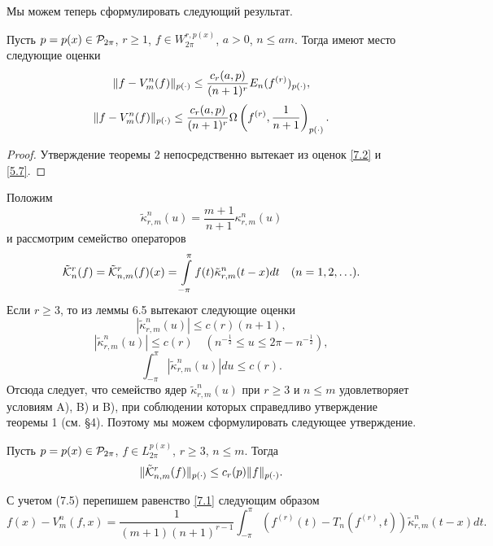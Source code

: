 Мы можем теперь сформулировать следующий результат.
\begin{theorem}\label{t2}
Пусть  $p=p(x)\in{\cal  P}_{2\pi}$, $r\ge1$, $f\in W^{r,p(x)}_{2\pi}$, $a>0$, $n\le am$. Тогда имеют место следующие оценки
\begin{equation}\label{7.3}
   \|f-V_m^n(f)\|_{p(\cdot)}\le {c_r(a,p)\over (n+1)^r}E_n(f^{(r)})_{p(\cdot)},
\end{equation}
\begin{equation}\label{7.4}
   \|f-V_m^n(f)\|_{p(\cdot)}\le {c_r(a,p)\over (n+1)^r}\Omega\left(f^{(r)},\frac1{n+1}\right)_{p(\cdot)}.
\end{equation}
\end{theorem}
\begin{proof}
Утверждение теоремы 2 непосредственно вытекает из оценок \eqref{7.2} и \eqref{5.7}.
\end{proof}
Положим
\begin{equation}\label{7.5}
    \tilde\kappa_{r,m}^{n}(u)= \frac{m+1}{n+1}\kappa_{r,m}^{n}(u)
\end{equation}
и рассмотрим семейство операторов
\begin{equation}\label{7.6}
    \tilde{\cal K}_n^r(f)=\tilde{\cal K}_{n,m}^r(f)(x)=
\int\limits_{-\pi}^{\pi}f(t)\tilde\kappa_{r,m}^{n}(t-x)dt\quad(n=1,2,\ldots).
\end{equation}
Если $r\ge3$, то из леммы 6.5 вытекают следующие оценки
 $$
 |\tilde\kappa_{r,m}^{n}(u)|\le c(r)(n+1),
 $$
$$
 |\tilde\kappa_{r,m}^{n}(u)|\le c(r) \quad (n^{-\frac12}\le u\le2\pi-n^{-\frac12}),
 $$
$$
\int_{-\pi}^\pi |\tilde\kappa_{r,m}^{n}(u)|du \le c(r).
$$
Отсюда следует, что семейство ядер $\tilde\kappa_{r,m}^{n}(u)$ при $r\ge3$ и $n\le m$ удовлетворяет условиям A), B) и B), при соблюдении
которых справедливо утверждение теоремы 1 (см. \S 4). Поэтому мы можем сформулировать следующее утверждение.
\begin{lemma}\label{l7.1}
 Пусть $p=p(x)\in{\cal P}_{2\pi}$, $f\in L^{p(x)}_{2\pi}$, $r\ge3$, $n\le m$. Тогда
$$\|\tilde{\cal K}_{n,m}^r(f)\|_{p(\cdot)}\le c_r(p)\|f\|_{p(\cdot)}.$$
  \end{lemma}
С учетом (7.5) перепишем   равенство \eqref{7.1} следующим образом
\begin{equation}\label{7.7}
  f(x)-V_m^n(f,x)= \frac{1}{(m+1)(n+1)^{r-1}}\int_{-\pi}^\pi (f^{(r)}(t)-T_n(f^{(r)},t))\tilde\kappa_{r,m}^n(t-x)dt.
\end{equation}

